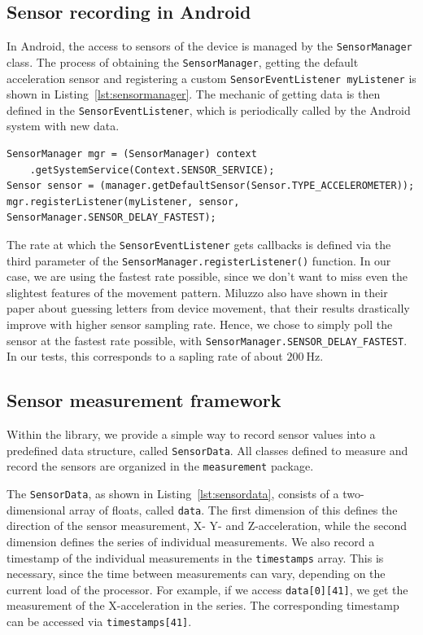 \subsection{Sensor recording in Android}\label{subsection:sensorrecording}
In Android, the access to sensors of the device is managed by the \lstinline$SensorManager$ class. The process of obtaining the \lstinline$SensorManager$, getting the default acceleration sensor and registering a custom \lstinline$SensorEventListener myListener$ is shown in Listing~\ref{lst:sensormanager}. The mechanic of getting data is then defined in the \lstinline$SensorEventListener$, which is periodically called by the Android system with new data.

\begin{lstlisting}[float,
caption={Obtaining the default acceleration sensor data in Android},
label={lst:sensormanager}]
SensorManager mgr = (SensorManager) context
    .getSystemService(Context.SENSOR_SERVICE);
Sensor sensor = (manager.getDefaultSensor(Sensor.TYPE_ACCELEROMETER));
mgr.registerListener(myListener, sensor, SensorManager.SENSOR_DELAY_FASTEST);
\end{lstlisting}

The rate at which the \lstinline$SensorEventListener$ gets callbacks is defined via the third parameter of the \lstinline$SensorManager.registerListener()$ function. In our case, we are using the fastest rate possible, since we don't want to miss even the slightest features of the movement pattern. Miluzzo \etal\cite{miluzzo2012tapprints} also have shown in their paper about guessing letters from device movement, that their results drastically improve with higher sensor sampling rate. Hence, we chose to simply poll the sensor at the fastest rate possible, with \lstinline$SensorManager.SENSOR_DELAY_FASTEST$. In our tests, this corresponds to a sapling rate of about $\SI{200}{\hertz}$.

\subsection{Sensor measurement framework}
Within the library, we provide a simple way to record sensor values into a predefined data structure, called \lstinline$SensorData$. All classes defined to measure and record the sensors are organized in the \lstinline$measurement$ package.

The \lstinline$SensorData$, as shown in Listing~\ref{lst:sensordata}, consists of a two-dimensional array of floats, called \lstinline$data$. The first dimension of this defines the direction of the sensor measurement, \ie X- Y- and Z-acceleration, while the second dimension defines the series of individual measurements. We also record a timestamp of the individual measurements in the \lstinline$timestamps$ array. This is necessary, since the time between measurements can vary, depending on the current load of the processor.
For example, if we access \lstinline$data[0][41]$, we get the  measurement of the X-acceleration in the series. The corresponding timestamp can be accessed via \lstinline$timestamps[41]$.


